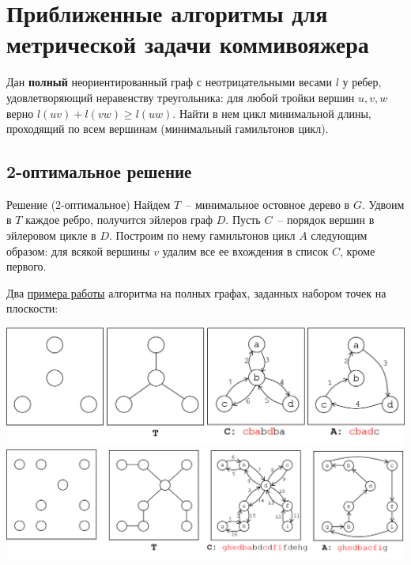 \section{Приближенные алгоритмы для метрической задачи коммивояжера}

\secauthor{\denis}

\begin{problem*}
	Дан \textbf{полный} неориентированный граф с неотрицательными весами $l$ у ребер, удовлетворяющий неравенству треугольника: для любой тройки вершин $u, v, w$ верно $l(uv) + l(vw) \geq l(uw)$. Найти в нем цикл минимальной длины, проходящий по всем вершинам (минимальный гамильтонов цикл).
\end{problem*}

\subsection{2-оптимальное решение}
\begin{algodescription}{Решение (2-оптимальное)}
    Найдем $T$~-- минимальное остовное дерево в $G$. Удвоим в $T$ каждое ребро, получится эйлеров граф $D$. Пусть $C$~-- порядок вершин в эйлеровом цикле в $D$. Построим по нему гамильтонов цикл $A$ следующим образом: для всякой вершины $v$ удалим все ее вхождения в список $C$, кроме первого.
\end{algodescription}

Два \underline{примера работы} алгоритма на полных графах, заданных набором точек на плоскости:
\begin{center}
\includegraphics[width=\textwidth]{figures/ex_shorthamil.png} \\
\includegraphics[width=\textwidth]{figures/ex_longhamil.png}
\end{center}

